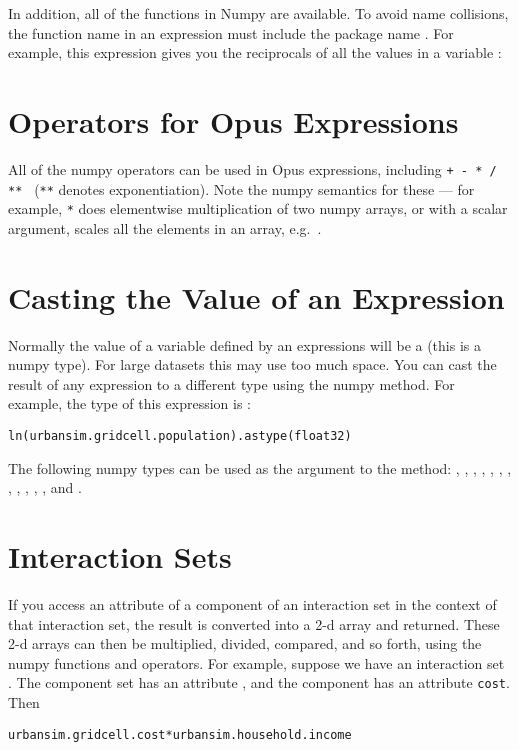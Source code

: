 In addition, all of the functions in Numpy are available.  To avoid name
collisions, the function name in an expression must include the package
name .  For example, this expression gives you the reciprocals
of all the values in a variable :


\section{Operators for Opus Expressions}

All of the numpy operators can be used in Opus expressions, including
\verb|+ - * / ** | (\verb|**| denotes exponentiation).  Note the
numpy semantics for these --- for example, \verb|*| does elementwise
multiplication of two numpy arrays, or with a scalar argument, scales all
 the elements in an array, e.g.\ .

\section{Casting the Value of an Expression}

Normally the value of a variable defined by an expressions will be a
 (this is a numpy type).  For large datasets this may use too
much space.  You can cast the result of any expression to a different type
using the numpy  method.  For example, the type of
this expression is :

\begin{verbatim}
ln(urbansim.gridcell.population).astype(float32)
\end{verbatim}

The following numpy types can be used as the argument to the 
method: , , , ,
, , , , 
, , , , and
.
 
\section{Interaction Sets}

If you access an attribute of a component of an interaction set in the
context of that interaction set, the result is converted into a 2-d array
and returned.  These 2-d arrays can then be multiplied, divided, compared,
and so forth, using the numpy functions and operators.  For example,
suppose we have an interaction set .  The
component  set has an attribute , and
the 
component has an attribute \verb|cost|.  Then
\begin{verbatim}
urbansim.gridcell.cost*urbansim.household.income
\end{verbatim}

